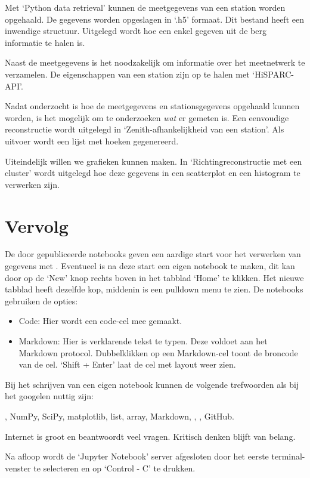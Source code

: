 Met `Python data retrieval' kunnen de meetgegevens van een station worden opgehaald. De gegevens worden opgeslagen in `.h5' formaat. Dit bestand heeft een inwendige structuur. Uitgelegd wordt hoe een enkel gegeven uit de berg informatie te halen is. 

Naast de meetgegevens is het noodzakelijk om informatie over het meetnetwerk te verzamelen. De eigenschappen van een station zijn op te halen met `HiSPARC-API'.  

Nadat onderzocht is hoe de meetgegevens en stationsgegevens opgehaald kunnen worden, is het mogelijk om te onderzoeken \textit{wat} er gemeten is. Een eenvoudige reconstructie wordt uitgelegd in `Zenith-afhankelijkheid van een station'. Als uitvoer wordt een lijst met hoeken gegenereerd.

Uiteindelijk willen we grafieken kunnen maken. In `Richtingreconstructie met een cluster' wordt uitgelegd hoe deze gegevens in een scatterplot en een histogram te verwerken zijn.

\section{Vervolg}

De door \hisparc gepubliceerde notebooks geven een aardige start voor het verwerken van gegevens met \python.
Eventueel is na deze start een eigen notebook te maken, dit kan door op de `New' knop rechts boven in het tabblad `Home' te
klikken. Het nieuwe tabblad heeft dezelfde kop, middenin is een pulldown menu te zien. De notebooks gebruiken de opties:

\begin{itemize}
\item Code: Hier wordt een code-cel mee gemaakt.
\item Markdown: Hier is verklarende tekst te typen. Deze voldoet aan het Markdown protocol. Dubbelklikken op een Markdown-cel
toont de broncode van de cel. `Shift + Enter' laat de cel met layout weer zien.
\end{itemize}

Bij het schrijven van een eigen notebook kunnen de volgende trefwoorden als bij het googelen nuttig zijn:

\python, NumPy, SciPy, matplotlib, list, array, Markdown, \hisparc, \sapphire, GitHub.

Internet is groot en beantwoordt veel vragen. Kritisch denken blijft van belang.

Na afloop wordt de `Jupyter Notebook' server afgesloten door
het eerste terminal-venster te selecteren en op `Control - C' te drukken.


